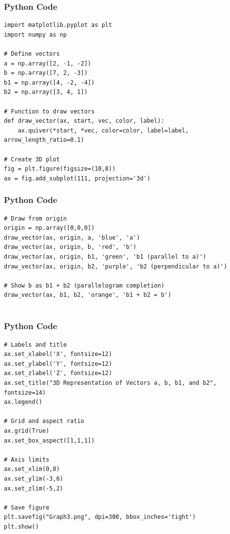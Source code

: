 \documentclass{beamer}
\begin{document}
\begin{frame}[fragile]
    \frametitle{Python Code}
    \begin{lstlisting}
import matplotlib.pyplot as plt
import numpy as np

# Define vectors
a = np.array([2, -1, -2])
b = np.array([7, 2, -3])
b1 = np.array([4, -2, -4])
b2 = np.array([3, 4, 1])

# Function to draw vectors
def draw_vector(ax, start, vec, color, label):
    ax.quiver(*start, *vec, color=color, label=label, arrow_length_ratio=0.1)

# Create 3D plot
fig = plt.figure(figsize=(10,8))
ax = fig.add_subplot(111, projection='3d')

\end{lstlisting}
\end{frame}

\begin{frame}[fragile]
    \frametitle{Python Code}

    \begin{lstlisting}
# Draw from origin
origin = np.array([0,0,0])
draw_vector(ax, origin, a, 'blue', 'a')
draw_vector(ax, origin, b, 'red', 'b')
draw_vector(ax, origin, b1, 'green', 'b1 (parallel to a)')
draw_vector(ax, origin, b2, 'purple', 'b2 (perpendicular to a)')

# Show b as b1 + b2 (parallelogram completion)
draw_vector(ax, b1, b2, 'orange', 'b1 + b2 = b')


    \end{lstlisting}
\end{frame}

\begin{frame}[fragile]
    \frametitle{Python Code}

    \begin{lstlisting}
# Labels and title
ax.set_xlabel('X', fontsize=12)
ax.set_ylabel('Y', fontsize=12)
ax.set_zlabel('Z', fontsize=12)
ax.set_title("3D Representation of Vectors a, b, b1, and b2", fontsize=14)
ax.legend()

# Grid and aspect ratio
ax.grid(True)
ax.set_box_aspect([1,1,1])

# Axis limits
ax.set_xlim(0,8)
ax.set_ylim(-3,6)
ax.set_zlim(-5,2)

# Save figure
plt.savefig("Graph3.png", dpi=300, bbox_inches='tight')
plt.show()




  \end{lstlisting}
\end{frame}
\end{document}
